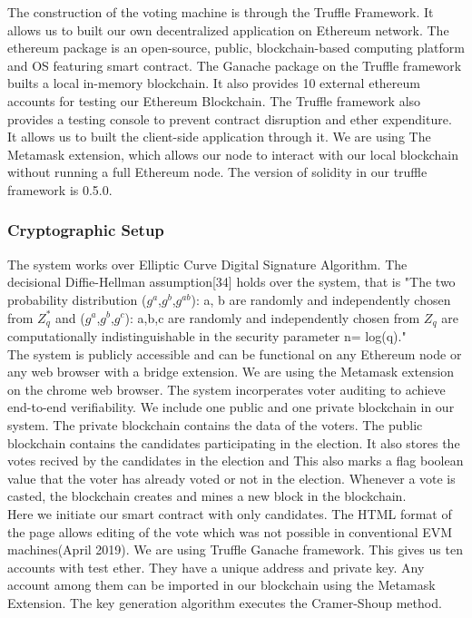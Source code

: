 \documentclass{report}
\begin{document}
The construction of the voting machine is through the Truffle Framework. It allows us to built our own decentralized application on Ethereum network. The ethereum package is an open-source, public, blockchain-based computing platform and OS featuring smart contract. The Ganache package on the Truffle framework builts a local in-memory blockchain. It also provides 10 external ethereum accounts for testing our Ethereum Blockchain. The Truffle framework also provides a testing console to prevent contract disruption and ether expenditure. It allows us to built the client-side application through it. We are using The Metamask extension\cite{WinNT32}, which allows our node to interact with our local blockchain without running a full Ethereum node. The version of solidity in our truffle framework is 0.5.0.
\subsubsection{Cryptographic Setup} The system works over Elliptic Curve Digital Signature Algorithm. The decisional Diffie-Hellman assumption[34] holds over the system, that is "The two probability distribution {($g^a$,$g^b$,$g^{ab}$): a, b are randomly and independently chosen from $Z^*_q$} and {($g^a$,$g^b$,$g^c$): a,b,c are randomly and independently chosen from $Z_q$} are computationally indistinguishable in the security parameter n= log(q)."\\
The system is publicly accessible and can be functional on any  Ethereum node or any web browser with a bridge extension. We are using the Metamask extension on the chrome web browser. The system incorperates voter auditing to achieve end-to-end verifiability. We include one public and one private blockchain in our system. The private blockchain contains the data of the voters. The public blockchain contains the candidates participating in the election. It also stores the votes recived by the candidates in the election and  This also marks a flag boolean value that the voter has already voted or not in the election. Whenever a vote is casted, the blockchain creates and mines a new block in the blockchain.\\
Here we initiate our smart contract with only candidates. The HTML format of the page allows editing of the vote which was not possible in conventional EVM machines(April 2019). We are using Truffle Ganache framework. This gives us ten accounts with test ether. They have a unique address and private key. Any account among them can be imported in our blockchain using the Metamask Extension. The key generation algorithm executes the Cramer-Shoup method.
\end{document}
